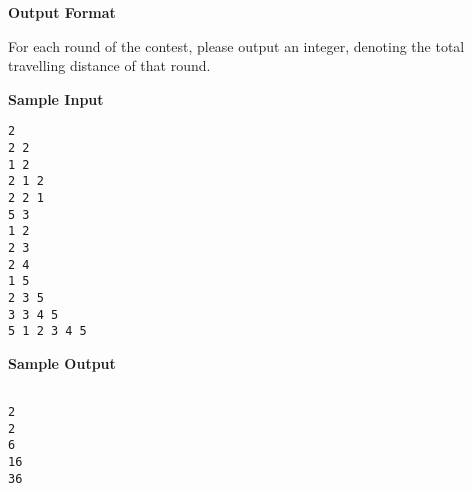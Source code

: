 \textbf{\large Output Format}

For each round of the contest, please output an integer, denoting the total travelling distance of that round.

\clearpage

\textbf{\large Sample Input}

\begin{verbatim}
2
2 2
1 2
2 1 2
2 2 1
5 3
1 2
2 3
2 4
1 5
2 3 5
3 3 4 5
5 1 2 3 4 5
\end{verbatim}

\textbf{\large Sample Output}
\begin{verbatim}

2
2
6
16
36
\end{verbatim}
